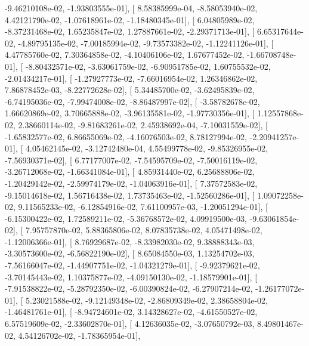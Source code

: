 \documentclass{article}
\begin{document}
         -9.46210108e-02,  -1.93803555e-01],
       [  8.58385999e-04,  -8.58053940e-02,   4.42121790e-02,
         -1.07618961e-02,  -1.18480345e-01],
       [  6.04805989e-02,  -8.37231468e-02,   1.65235847e-02,
          1.27887661e-02,  -2.29371713e-01],
       [  6.65317644e-02,  -4.89795135e-02,  -7.00185994e-02,
         -9.73573382e-02,  -1.12241126e-01],
       [  4.47785760e-02,   7.30364858e-02,  -4.10406106e-02,
          1.67677452e-02,  -1.66708748e-01],
       [ -8.80432571e-02,  -3.63061759e-02,  -6.90951785e-02,
          1.60755532e-02,  -2.01434217e-01],
       [ -1.27927773e-02,  -7.66016954e-02,   1.26346862e-02,
          7.86878452e-03,  -8.22772628e-02],
       [  5.34485700e-02,  -3.62495839e-02,  -6.74195036e-02,
         -7.99474008e-02,  -8.86487997e-02],
       [ -3.58782678e-02,   1.66620869e-02,   3.70665888e-02,
         -3.96135581e-02,  -1.97730356e-01],
       [  1.12557868e-02,   2.38660114e-02,  -9.81683261e-02,
          2.45938692e-04,  -7.10031559e-02],
       [ -1.65832577e-02,   6.86655069e-02,  -4.16076503e-02,
          8.78127994e-02,  -2.20941257e-01],
       [  4.05462145e-02,  -3.12742480e-04,   4.55499778e-02,
         -9.85326955e-02,  -7.56930371e-02],
       [  6.77177007e-02,  -7.54595709e-02,  -7.50016119e-02,
         -3.26712068e-02,  -1.66341084e-01],
       [  4.85931440e-02,   6.25688806e-02,  -1.20429142e-02,
         -2.59974179e-02,  -1.04063916e-01],
       [  7.37572583e-02,  -9.15014618e-02,   1.56716438e-02,
          1.73735463e-02,  -1.52560286e-01],
       [  1.09072258e-02,   9.11565233e-02,  -6.12854916e-02,
          7.61100957e-03,  -1.20051294e-01],
       [ -6.15300422e-02,   1.72589211e-02,  -5.36768572e-02,
          4.09919500e-03,  -9.63061854e-02],
       [  7.95757870e-02,   5.88365806e-02,   8.07835738e-02,
          4.05471498e-02,  -1.12006366e-01],
       [  8.76929687e-02,  -8.33982030e-02,   9.38888343e-03,
         -3.30573600e-02,  -6.56822190e-02],
       [  8.65084550e-03,   1.13254702e-03,  -7.56166047e-02,
         -1.44907751e-02,  -1.04321279e-01],
       [ -9.92379621e-02,  -3.70145443e-02,   1.10375877e-02,
         -4.09150130e-02,  -1.18579901e-01],
       [ -7.91538822e-02,  -5.28792350e-02,  -6.00390824e-02,
         -6.27907214e-02,  -1.26177072e-01],
       [  5.23021588e-02,  -9.12149348e-02,  -2.86809349e-02,
          2.38658804e-02,  -1.46481761e-01],
       [ -8.94724601e-02,   3.14328627e-02,  -4.61550527e-02,
          6.57519609e-02,  -2.33602870e-01],
       [  4.12636035e-02,  -3.07650792e-03,   8.49801467e-02,
          4.54126702e-02,  -1.78365954e-01],
\end{document}
